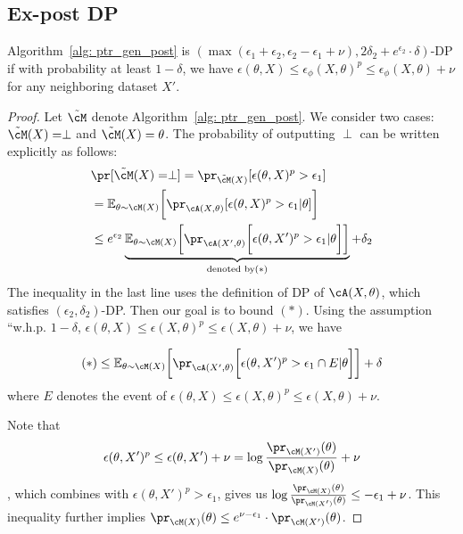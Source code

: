 
\subsection{Ex-post DP}

\begin{theorem}
Algorithm~\ref{alg: ptr_gen_post} is $(\max(\epsilon_1 +\epsilon_2, \epsilon_2 -\epsilon_1 +\nu), 2\delta_2 +e^{\epsilon_2}\cdot \delta)$-DP if with probability at least $1-\delta$, we have $\epsilon(\theta, X)\leq \epsilon_\phi(X, \theta)^p\leq \epsilon_\phi(X,\theta) + \nu$ for any neighboring dataset $X'$.
\end{theorem}

\begin{proof}

Let $\tilde{\cM}$ denote Algorithm~\ref{alg: ptr_gen_post}.
We consider two cases: $\tilde{\cM}(X)=\perp$ and $\tilde{\cM}(X)=\theta$.
The probability of outputting $\perp$ can be written explicitly as follows:
\begin{align*}
&\pr[\tilde{\cM}(X)=\perp] = \pr_{\tilde{\cM}(X)}[\epsilon(\theta, X)^p>\epsilon_1]\\
&= \mathbb{E}_{\theta \sim \cM(X)}\bigg[ \pr_{\cA(X, \theta)}[\epsilon(\theta, X)^p >\epsilon_1|\theta]\bigg]\\
&\leq e^{\epsilon_2} \underbrace{{\mathbb{E}_{\theta \sim \cM(X)}\bigg[ \pr_{\cA(X',\theta)}\bigg[\epsilon(\theta, X')^p >\epsilon_1|\theta\bigg]\bigg]}}_{\text{denoted by} (*) } + \delta_2\\
\end{align*}
The inequality in the last line uses the definition of DP of $\cA(X,\theta)$, which satisfies $(\epsilon_2, \delta_2)$-DP.
Then our goal is to bound $(*)$.  Using the assumption ``w.h.p. $1-\delta$, $\epsilon(\theta, X)\leq \epsilon(X, \theta)^p\leq \epsilon(X,\theta) + \nu$, we have 

\[ (*)\leq \mathbb{E}_{\theta \sim \cM(X)}\bigg[ \pr_{\cA(X',\theta)}\bigg[\epsilon(\theta, X')^p >\epsilon_1
\cap E | \theta \bigg]\bigg] + \delta\]
where $E$ denotes the event of $\epsilon(\theta, X)\leq \epsilon(X, \theta)^p\leq \epsilon(X,\theta) + \nu$.

Note that \[\epsilon(\theta, X')^p \leq \epsilon(\theta, X') +\nu = \log \frac{\pr_{\cM(X')}(\theta)}{\pr_{\cM(X)}(\theta)} + \nu\], which combines with $\epsilon(\theta,X')^p>\epsilon_1$, gives us $\log \frac{\pr_{\cM(X)}(\theta)}{\pr_{\cM(X')}(\theta)} \leq -\epsilon_1 + \nu$. This inequality further implies $\pr_{\cM(X)}(\theta)\leq e^{\nu-\epsilon_1}\cdot \pr_{\cM(X')}(\theta)$.


\end{proof}
